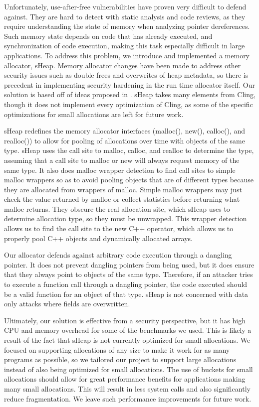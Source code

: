 \documentclass[conference]{IEEEtran}
\begin{document}
Unfortunately, use-after-free vulnerabilities have proven very difficult 
to defend against. They are hard to detect with static analysis and code 
reviews, as they require understanding the state of memory when analyzing 
pointer dereferences. Such memory state depends on code that has already 
executed, and synchronization of code execution, making this task 
especially difficult in large applications. To address this problem, we 
introduce and implemented a memory allocator, sHeap. Memory allocator 
changes have been made to address other security issues such as double 
frees and overwrites of heap metadata, so there is precedent in 
implementing security hardening in the run time allocator itself. Our 
solution is based off of ideas proposed in \cite{b1}. sHeap takes many 
elements from Cling, though it does not implement every optimization of 
Cling, as some of the specific optimizations for small allocations are 
left for future work. 

sHeap redefines the memory allocator interfaces (malloc(), new(), 
calloc(), and realloc()) to allow for pooling of allocations over time 
with objects of the same type. sHeap uses the call site to malloc, 
calloc, and realloc to determine the type, assuming that a call site to 
malloc or new will always request memory of the same type. It also does 
malloc wrapper detection to find call sites to simple malloc wrappers so 
as to avoid pooling objects that are of different types because they are 
allocated from wrappers of malloc. Simple malloc wrappers may just check the value returned by malloc or collect statistics before returning what malloc returns. They obscure the real allocation site, which sHeap uses to determine allocation type, so they must be unwrapped.  This wrapper detection allows us to find the call site to the new C++ operator, which allows us to properly pool C++ objects and dynamically allocated arrays. 

Our allocator defends against arbitrary code execution through a dangling 
pointer.  It does not prevent dangling pointers from being used, but it 
does ensure that they always point to objects of the same type. Therefore, 
if an attacker tries to execute a function call through a dangling 
pointer, the code executed should be a valid function for an object of 
that type.  sHeap is not concerned with data only attacks where fields 
are overwritten. 

Ultimately, our solution is effective from a security perspective, but it 
has high CPU and memory overhead for some of the benchmarks we used. This 
is likely a result of the fact that sHeap is not currently optimized for 
small allocations.  We focused on supporting allocations of any size to 
make it work for as many programs as possible, so we tailored our project 
to support large allocations instead of also being optimized for small 
allocations.  The use of buckets for small allocations should allow for 
great performance benefits for applications making many small allocations. 
This will result in less system calls and also significantly reduce 
fragmentation. We leave such performance improvements for future work.
\end{document}
